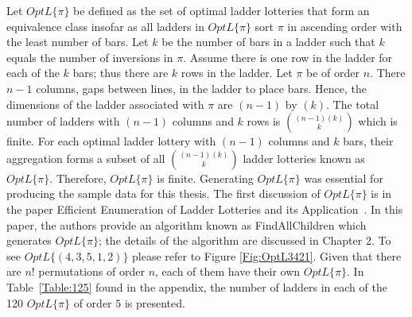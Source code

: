 Let $OptL\{\pi\}$ be defined as the set of optimal ladder lotteries that form an equivalence class 
insofar as all ladders in $OptL\{\pi\}$ sort $\pi$ in ascending order with the least number of bars.
Let $k$ be the number of bars in a ladder such that $k$ equals the number of inversions 
in $\pi$.  Assume there is one row in the ladder for each of the $k$ bars; thus there are $k$ rows in the ladder. Let $\pi$ be of order $n$.
There $n-1$ columns, gaps between lines, in the ladder to place bars. Hence, the dimensions of the ladder associated with $\pi$
are $(n-1)$ by $(k)$. The total number of ladders with $(n-1)$ columns and $k$ rows is ${(n-1)(k) \choose k}$ which is finite. 
For each optimal ladder lottery with $(n-1)$ columns and $k$ bars, their aggregation forms a subset of 
all ${(n-1)(k) \choose k}$ ladder lotteries known as $OptL\{\pi\}$. Therefore, $OptL\{\pi\}$ is finite. 
Generating $OptL\{\pi\}$ was essential for producing the sample data for this thesis. The first discussion of 
$OptL\{\pi\}$ is in the paper Efficient Enumeration of Ladder Lotteries and its Application~\cite{A1}.
In this paper, the authors provide an algorithm known as {\sc FindAllChildren}
which generates $OptL\{\pi\}$; the details of the algorithm are discussed in Chapter 2.
To see $OptL\{(4,3,5,1,2)\}$ please refer to Figure \ref{Fig:OptL3421}.
Given that there are $n!$ permutations of order $n$, each of them 
have their own $OptL\{\pi\}$. In Table~\ref{Table:125} found in the appendix, 
the number of ladders in each of the 120 $OptL\{\pi\}$ of order $5$ is presented.
